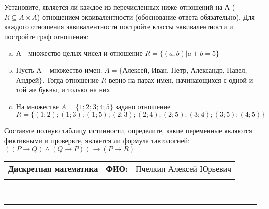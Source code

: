 \documentclass[10pt]{exam}
\newcommand{\class}{Дискретная математика}
\newcommand{\examdate}{}
\begin{document}
\begin{questions}
\question
Установите, является ли каждое из перечисленных ниже отношений на А ($R \subseteq A \times A$) отношением эквивалентности (обоснование ответа обязательно). Для каждого отношения эквивалентности постройте классы 
эквивалентности и постройте граф отношения:
\begin{enumerate} [a)]\setcounter{enumi}{0}
\item А - множество целых чисел и отношение $R = \{(a,b)|a + b = 5\}$
\item Пусть A – множество имен. $A = \{ $Алексей, Иван, Петр, Александр, Павел, Андрей$ \}$. Тогда отношение $R $ верно на парах имен, начинающихся с одной и той же буквы, и только на них.
\item На множестве $A = \{1; 2; 3; 4; 5\}$ задано отношение $R = \{(1; 2); (1; 3); (1; 5); (2; 3); (2; 4); (2; 5); (3; 4); (3; 5); (4; 5)\}$
\end{enumerate}\question Составьте полную таблицу истинности, определите, какие переменные являются фиктивными и проверьте, является ли формула тавтологией:
$(( P \rightarrow Q) \land (Q \rightarrow P)) \rightarrow (P \rightarrow R)$

\end{questions}
\newpage
\begin{flushright}
\begin{tabular}{p{2.8in} r l}
\textbf{\class} & \textbf{ФИО:} &Пчелкин Алексей Юрьевич
\\

\textbf{\examdate} &&\\
\end{tabular}\\
\end{flushright}
\rule[1ex]{\textwidth}{.1pt}
\end{document}
